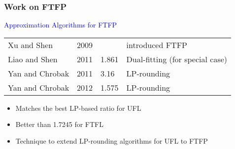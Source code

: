 \documentclass[handout, hyperref, dvipsnames]{beamer}
\begin{document}
\begin{frame}
  \frametitle{Work on FTFP}
  
  {\Large
    \textcolor{blue}
    {Approximation Algorithms for FTFP}
  }

    \vspace{.3in}
    \begin{tabular}{ l l l l }
	  \rowcolor{GreenYellow}
      Xu and Shen & 2009 &  & introduced FTFP\\
      \rowcolor{Pink}
      Liao and Shen & 2011 & 1.861 & Dual-fitting (for special case)\\
      \rowcolor{SkyBlue}
      Yan and Chrobak & 2011 & 3.16 & LP-rounding\\
      \rowcolor{SkyBlue}
      Yan and Chrobak & 2012 & 1.575 & LP-rounding\\
    \end{tabular}
    \vspace{.175in}

  \begin{itemize}
  \item Matches the best LP-based ratio for UFL
	\item Better than 1.7245 for FTFL
  \item Technique to extend LP-rounding algorithms for UFL to FTFP
  \end{itemize}
\end{frame}


\end{document}
